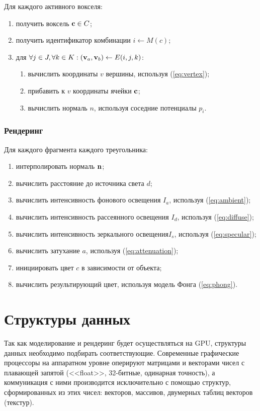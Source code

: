 Для каждого активного вокселя:
\begin{enumerate}
  \item получить воксель $\boldsymbol{\mathbf{c}}\in C$;
  \item получить идентификатор комбинации $i\gets M(c)$;
  \item для $\forall j\in J, \forall k\in K: (\boldsymbol{\mathbf{v}}_a, \boldsymbol{\mathbf{v}}_b)\gets E(i, j, k)$:
    \begin{enumerate}
      \item вычислить координаты $v$ вершины, используя (\ref{eq:vertex});
      \item прибавить к $v$ координаты ячейки $\boldsymbol{\mathbf{c}}$;
      \item вычислить нормаль $n$, используя соседние потенциалы $p_i$.
    \end{enumerate}
\end{enumerate}


\subsubsection{Рендеринг}
Для каждого фрагмента каждого треугольника:
\begin{enumerate}
  \item интерполировать нормаль $\boldsymbol{\mathbf{n}}$;
  \item вычислить расстояние до источника света $d$;
  \item вычислить интенсивность фонового освещения $I_a$, используя (\ref{eq:ambient});
  \item вычислить интенсивность рассеянного освещения $I_d$, используя (\ref{eq:diffuse});
  \item вычислить интенсивность зеркального освещения$I_s$, используя (\ref{eq:specular});
  \item вычислить затухание $a$, используя (\ref{eq:attenuation});
  \item инициировать цвет $c$ в зависимости от объекта;
  \item вычислить результирующий цвет, используя модель Фонга (\ref{eq:phong}).
\end{enumerate}


\section{Структуры данных}
Так как моделирование и рендеринг будет осуществляться на GPU, структуры данных необходимо подбирать соответствующие. Современные графические процессоры на аппаратном уровне оперируют матрицами и векторами чисел с плавающей запятой (<<float>>, 32-битные, одинарная точность), а коммуникация с ними производится исключительно с помощью структур, сформированных из этих чисел: векторов, массивов, двумерных таблиц векторов (текстур).

